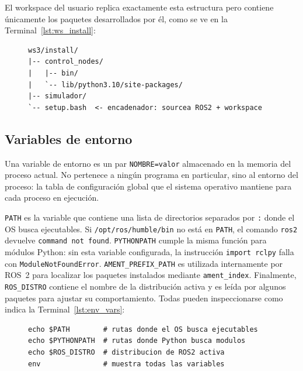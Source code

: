 El workspace del usuario replica exactamente esta estructura pero contiene únicamente los paquetes desarrollados por él, como se ve en la Terminal~\ref{lst:ws_install}:

\begin{figure}[H]
\centering
\begin{lstlisting}[style=bash, caption={Estructura del workspace tras compilar con \texttt{colcon build}.}, label={lst:ws_install}]
ws3/install/
|-- control_nodes/
|   |-- bin/
|   `-- lib/python3.10/site-packages/
|-- simulador/
`-- setup.bash  <- encadenador: sourcea ROS2 + workspace
\end{lstlisting}
\end{figure}

\subsection{Variables de entorno}

Una variable de entorno es un par \texttt{NOMBRE=valor} almacenado en la memoria del proceso actual. No pertenece a ningún programa en particular, sino al entorno del proceso: la tabla de configuración global que el sistema operativo mantiene para cada proceso en ejecución.

\texttt{PATH} es la variable que contiene una lista de directorios separados por \texttt{:} donde el OS busca ejecutables. Si \texttt{/opt/ros/humble/bin} no está en \texttt{PATH}, el comando \texttt{ros2} devuelve \texttt{command not found}. \texttt{PYTHONPATH} cumple la misma función para módulos Python: sin esta variable configurada, la instrucción \texttt{import rclpy} falla con \texttt{ModuleNotFoundError}. \texttt{AMENT\_PREFIX\_PATH} es utilizada internamente por ROS~2 para localizar los paquetes instalados mediante \texttt{ament\_index}. Finalmente, \texttt{ROS\_DISTRO} contiene el nombre de la distribución activa y es leída por algunos paquetes para ajustar su comportamiento. Todas pueden inspeccionarse como indica la Terminal~\ref{lst:env_vars}:

\begin{figure}[H]
\centering
\begin{lstlisting}[style=bash, caption={Inspección de variables de entorno relevantes.}, label={lst:env_vars}]
echo $PATH        # rutas donde el OS busca ejecutables
echo $PYTHONPATH  # rutas donde Python busca modulos
echo $ROS_DISTRO  # distribucion de ROS2 activa
env               # muestra todas las variables
\end{lstlisting}
\end{figure}

